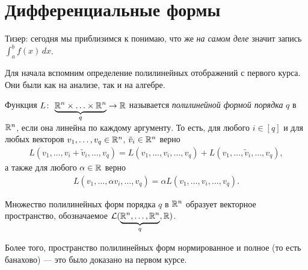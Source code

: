 
\section{Дифференциальные формы}

Тизер: сегодня мы приблизимся к понимаю, что же \textit{на самом деле} значит запись $\int_{a}^{b} f(x) \, dx $.

Для начала вспомним определение полилинейных отображений с первого курса. Они были как на анализе, так и на алгебре.

\begin{df}
 Функция $L \colon\, \underbrace{\mathbb{R}^{n} \times \ldots \times \mathbb{R}^{n}}_{q} \to \mathbb{R}  $ называется \textit{полилинейной формой порядка} $q$ в $\mathbb{R}^{n}$, если она линейна по каждому аргументу. То есть, для любого $i \in [q]$ и для любых векторов $v_1, \ldots, v_q \in \mathbb{R}^{n}$, $\tilde v_i \in \mathbb{R}^{n}$ верно
 \begin{align*}
  L(v_1, \ldots, v_i + \tilde v_i, \ldots, v_q) = L(v_1, \ldots, v_i, \ldots, v_q) + L(v_1, \ldots, \tilde v_i, \ldots, v_q)
 ,\end{align*} а также для любого $\alpha \in \mathbb{R}$ верно
 \begin{align*}
  L(v_1, \ldots, \alpha v_i, \ldots, v_q) = \alpha L(v_1, \ldots, v_i, \ldots, v_q)
 .\end{align*} 
\end{df}
\begin{prop*}
 Множество полилинейных форм порядка $q$ в $\mathbb{R}^{n}$ образует векторное пространство, обозначаемое $\mathcal{L}(\underbrace{\mathbb{R}^{n}, \ldots, \mathbb{R}^{n}}_{q}, \mathbb{R})$.
\end{prop*}
Более того, пространство полилинейных форм нормированное и полное (то есть банахово) --- это было доказано на первом курсе.

